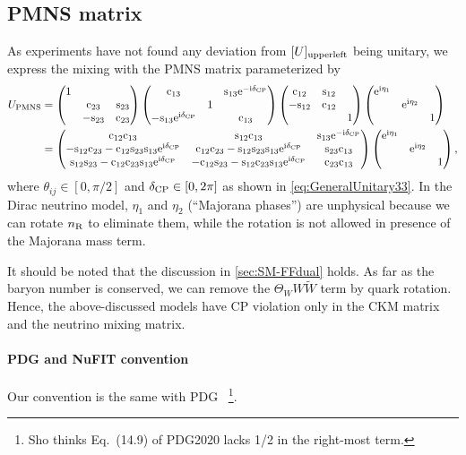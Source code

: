\documentclass[CheatSheet]{subfiles}
\begin{document}
\subsection{PMNS matrix}\label{sec:PMNS}
As experiments have not found any deviation from $[U]\w{upper left}$ being unitary, we express the mixing with the PMNS matrix
parameterized by
\begin{equation}
\begin{split}
   U\w{PMNS}&=
 \pmat{1&&\\&\co{23}&\si{23}\\&-\si{23}&\co{23}}
 \pmat{\co{13}&&\si{13}\ee^{-\ii\delta\w{CP}}\\&1&\\-\si{13}\ee^{\ii\delta\w{CP}}&&\co{13}}
 \pmat{\co{12}&\si{12}&\\-\si{12}&\co{12}&\\&&1}
\pmat{\ee^{\ii\eta_1} \\ & \ee^{\ii\eta_2}\\&&1}
\\&=
 \pmat{
 \co{12} \co{13} & \si{12} \co{13} & \si{13} \ee^{-\ii\delta\w{CP}}\\
 -\si{12} \co{23} - \co{12} \si{23} \si{13} \ee^{\ii\delta\w{CP}}& \co{12} \co{23} - \si{12}\si{23}\si{13} \ee^{\ii\delta\w{CP}}& \si{23}\co{13}\\
  \si{12}\si{23} - \co{12} \co{23} \si{13}\ee^{\ii\delta\w{CP}} & -\co{12}\si{23}-\si{12}\co{23}\si{13}\ee^{\ii\delta\w{CP}} & \co{23} \co{13}
}\pmat{\ee^{\ii\eta_1} \\ & \ee^{\ii\eta_2}\\&&1},
\end{split}
\end{equation}
where $\theta_{ij}\in[0,\pi/2]$ and $\delta\w{CP}\in[0,2\pi]$ as shown in \cref{eq:GeneralUnitary33}.
In the Dirac neutrino model, $\eta_1$ and $\eta_2$ (``Majorana phases'') are unphysical because we can rotate $n_{\mathrm{R}}$ to eliminate them, while the rotation is not allowed in presence of the Majorana mass term.

It should be noted that the discussion in \cref{sec:SM-FFdual} holds.
As far as the baryon number is conserved, we can remove the $\Theta_W W\tilde W$ term by quark rotation.
Hence, the above-discussed models have CP violation only in the CKM matrix and the neutrino mixing matrix.




\paragraph{PDG and NuFIT convention}
Our convention is the same with PDG \cite[\S14]{PDG2020}~\footnote{Sho thinks Eq.~(14.9) of PDG2020 lacks 1/2 in the right-most term.}.
\end{document}
